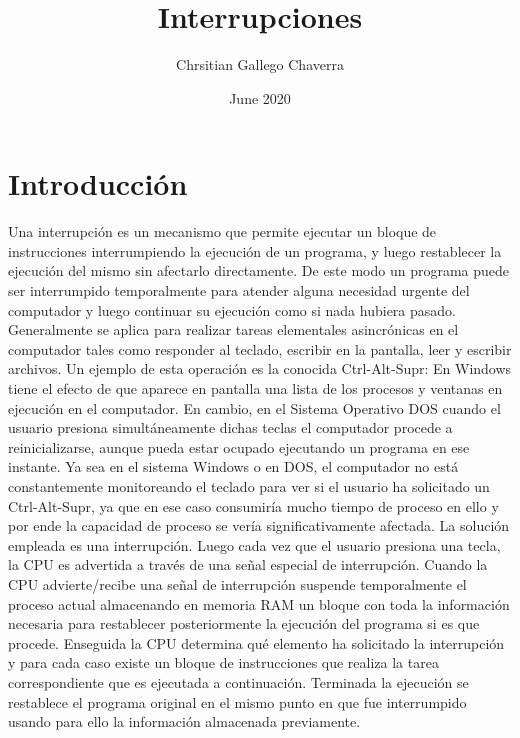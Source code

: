\documentclass{article}
\title{Interrupciones}
\author{Chrsitian Gallego Chaverra}
\date{June 2020}
\begin{document}
\maketitle

\section{Introducción}
Una interrupción es un mecanismo que permite ejecutar un bloque de instrucciones interrumpiendo la ejecución de un programa, y luego restablecer la ejecución del mismo sin afectarlo directamente. De este modo un programa puede ser interrumpido temporalmente para atender alguna necesidad urgente del computador y luego continuar su ejecución como si nada hubiera pasado.
Generalmente se aplica para realizar tareas elementales asincrónicas en el computador tales como responder al teclado, escribir en la pantalla, leer y escribir archivos. Un ejemplo de esta operación es la conocida Ctrl-Alt-Supr: En Windows tiene el efecto de que aparece en pantalla una lista de los procesos y ventanas en ejecución en el computador. En cambio, en el Sistema Operativo DOS cuando el usuario presiona simultáneamente dichas teclas el computador procede a reinicializarse, aunque pueda estar ocupado ejecutando un programa en ese instante. Ya sea en el sistema Windows o en DOS, el computador no está constantemente monitoreando el teclado para ver si el usuario ha solicitado un Ctrl-Alt-Supr, ya que en ese caso consumiría mucho tiempo de proceso en ello y por ende la capacidad de proceso se vería significativamente afectada. La solución empleada es una interrupción.
Luego cada vez que el usuario presiona una tecla, la CPU es advertida a través de una señal especial de interrupción. Cuando la CPU advierte/recibe una señal de interrupción suspende temporalmente el proceso actual almacenando en memoria RAM un bloque con toda la información necesaria para restablecer posteriormente la ejecución del programa si es que procede. Enseguida la CPU determina qué elemento ha solicitado la interrupción y para cada caso existe un bloque de instrucciones que realiza la tarea correspondiente que es ejecutada a continuación. Terminada la ejecución se restablece el programa original en el mismo punto en que fue interrumpido usando para ello la información almacenada previamente. \cite{InterSos}
\end{document}
